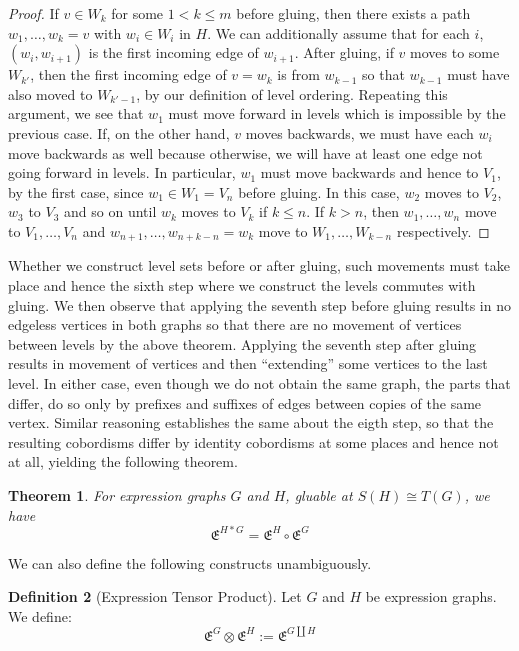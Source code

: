 \documentclass{amsart}
\newcommand{\tensor}{\otimes}
\newcommand{\Exp}[1]{\mathfrak{E}^{#1}}
\newcommand{\li}[1][]{\ifthenelse{\equal{#1}{}}{\item}{\item \label{#1}}}
\newenvironment{enmrt}{
  \enumerate[(i)]
  \setlength{\itemsep}{0pt}
}{
  \endenumerate
}
\newtheorem{thm}{Theorem}
\numberwithin{thm}{section}
\theoremstyle{definition}
\newtheorem{defn}[thm]{Definition}
\begin{document}
\begin{proof}
\begin{enmrt}
\li If $v \in W_k$ for some $1 < k \leq m$ before gluing, then there exists a
path $w_1, \dots, w_k = v$ with $w_i \in W_i$ in $H$. We can additionally assume
that for each $i$, $(w_i, w_{i + 1})$ is the first incoming edge of $w_{i + 1}$.
After gluing, if $v$ moves to some $W_{k'}$, then the first incoming edge of
$v = w_k$ is from $w_{k - 1}$ so that $w_{k - 1}$ must have also moved to
$W_{k' - 1}$, by our definition of level ordering. Repeating this argument, we
see that $w_1$ must move forward in levels which is impossible by the previous
case. If, on the other hand, $v$ moves backwards, we must have each $w_i$ move
backwards as well because otherwise, we will have at least one edge not going
forward in levels. In particular, $w_1$ must move backwards and hence to $V_1$,
by the first case, since $w_1 \in W_1 = V_n$ before gluing.
In this case, $w_2$ moves to $V_2$, $w_3$ to $V_3$ and so on until $w_k$ moves
to $V_k$ if $k \leq n$. If $k > n$, then $w_1, \dots, w_n$ move to
$V_1, \dots, V_n$ and $w_{n + 1}, \dots, w_{n + k - n} = w_k$ move to
$W_1, \dots, W_{k - n}$ respectively.
\end{enmrt}
\end{proof}

Whether we construct level sets before or after gluing, such movements must take
place and hence the sixth step where we construct the levels commutes with
gluing. We then observe that applying the seventh step before gluing results in
no edgeless vertices in both graphs so that there are no movement of vertices
between levels by the above theorem. Applying the seventh step after gluing
results in movement of vertices and then ``extending'' some vertices to the last
level. In either case, even though we do not obtain the same graph, the parts
that differ, do so only by prefixes and suffixes of edges between copies of the
same vertex. Similar reasoning establishes the same about the eigth step, so
that the resulting cobordisms differ by identity cobordisms at some places and
hence not at all, yielding the following theorem.

\begin{thm}
For expression graphs $G$ and $H$, gluable at $S(H) \cong T(G)$, we have
\[
  \Exp{H * G} = \Exp{H} \circ \Exp{G}
\]
\end{thm}

We can also define the following constructs unambiguously.

\begin{defn}[Expression Tensor Product]
Let $G$ and $H$ be expression graphs. We define:
\[
  \Exp{G} \tensor \Exp{H} := \Exp{G \amalg H}
\]
\end{defn}
\end{document}
